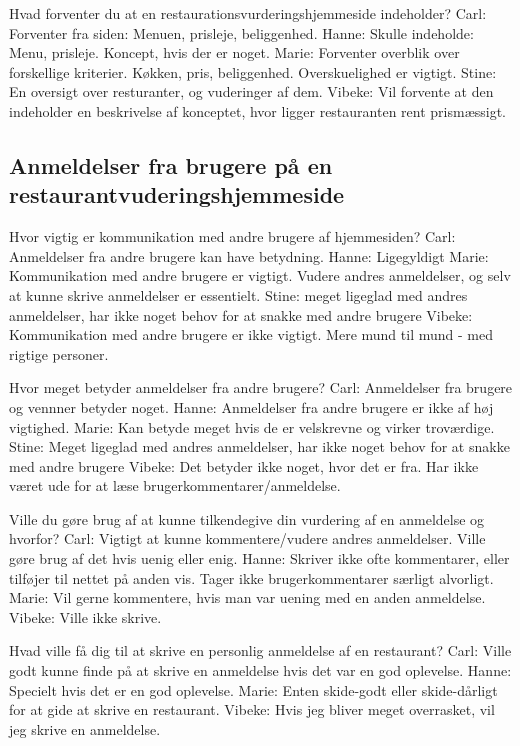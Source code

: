 \documentclass[a4paper, 12pt]{article}
\begin{document}
  Hvad forventer du at en restaurationsvurderingshjemmeside indeholder?
    Carl: Forventer fra siden: Menuen, prisleje, beliggenhed.
    Hanne: Skulle indeholde: Menu, prisleje. Koncept, hvis der er noget.
    Marie: Forventer overblik over forskellige kriterier. Køkken, pris, beliggenhed.
	   Overskuelighed er vigtigt.
    Stine: En oversigt over resturanter, og vuderinger af dem.
    Vibeke: Vil forvente at den indeholder en beskrivelse af konceptet, hvor ligger
	    restauranten rent prismæssigt.

\subsection{Anmeldelser fra brugere på en restaurantvuderingshjemmeside}

  Hvor vigtig er kommunikation med andre brugere af hjemmesiden?
    Carl: Anmeldelser fra andre brugere kan have betydning.
    Hanne: Ligegyldigt
    Marie: Kommunikation med andre brugere er vigtigt. Vudere andres anmeldelser, 
	   og selv at kunne skrive anmeldelser er essentielt.
    Stine: meget ligeglad med andres anmeldelser, har ikke noget behov for at snakke med andre brugere
    Vibeke: Kommunikation med andre brugere er ikke vigtigt. Mere mund til mund - med
	    rigtige personer.

  Hvor meget betyder anmeldelser fra andre brugere?
    Carl: Anmeldelser fra brugere og vennner betyder noget.
    Hanne: Anmeldelser fra andre brugere er ikke af høj vigtighed.
    Marie: Kan betyde meget hvis de er velskrevne og virker troværdige.
    Stine: Meget ligeglad med andres anmeldelser, har ikke noget behov for at snakke med andre brugere
    Vibeke: Det betyder ikke noget, hvor det er fra. Har ikke været ude for at læse
	    brugerkommentarer/anmeldelse.

  Ville du gøre brug af at kunne tilkendegive din vurdering af en anmeldelse
  og hvorfor?
    Carl: Vigtigt at kunne kommentere/vudere andres anmeldelser. Ville gøre brug af det hvis uenig eller enig.
    Hanne: Skriver ikke ofte kommentarer, eller tilføjer til nettet på anden vis. Tager ikke brugerkommentarer særligt alvorligt.
    Marie: Vil gerne kommentere, hvis man var uening med en anden anmeldelse.
    Vibeke: Ville ikke skrive.

  Hvad ville få dig til at skrive en personlig anmeldelse af en restaurant?
    Carl: Ville godt kunne finde på at skrive en anmeldelse hvis det var en god oplevelse.
    Hanne: Specielt hvis det er en god oplevelse.
    Marie: Enten skide-godt eller skide-dårligt for at gide at skrive en restaurant.
    Vibeke: Hvis jeg bliver meget overrasket, vil jeg skrive en anmeldelse.
\end{document}

